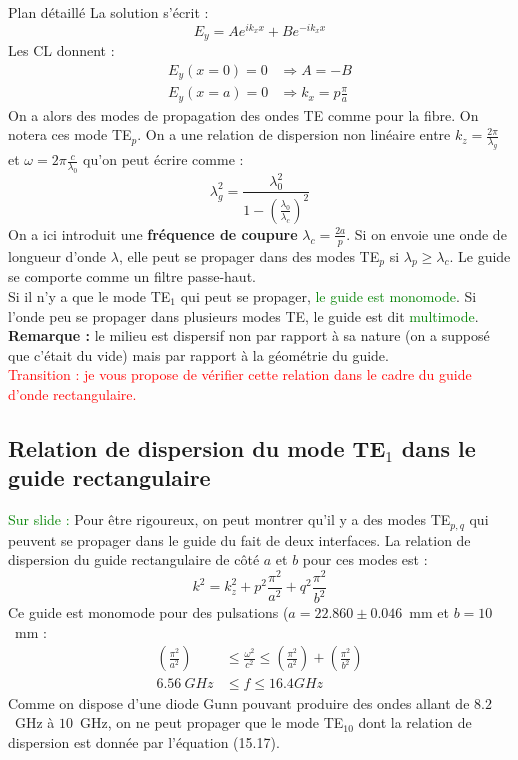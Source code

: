 \begin{reportBlock}{Plan détaillé}
  La solution s'écrit : 
  \begin{equation}
      E_y = Ae^{ik_xx}+Be^{-ik_xx}
  \end{equation}
  Les CL donnent :
  \begin{align}
      E_y(x=0)=0 &\Rightarrow A=-B \\
      E_y(x=a)=0 &\Rightarrow k_x=p\frac{\pi}{a}
  \end{align}
  On a alors des modes de propagation des ondes TE comme pour la fibre. On notera ces mode TE$_{p}$. On a une relation de dispersion non linéaire entre $k_z=\frac{2\pi}{\lambda_g}$ et $\omega=2\pi\frac{c}{\lambda_0}$ qu'on peut écrire comme :
  \begin{equation}
      \lambda_g^2 = \frac{\lambda_0^2}{1-\left(\frac{\lambda_0}{\lambda_c}\right)^2}
  \end{equation}
  On a ici introduit une \textbf{fréquence de coupure} $\lambda_c=\frac{2a}{p}$. Si on envoie une onde de longueur d'onde $\lambda$, elle peut se propager dans des modes TE$_p$ si $\lambda_p\geq\lambda_c$. Le guide se comporte comme un filtre passe-haut.\\
  
  Si il n'y a que le mode TE$_1$ qui peut se propager, \textcolor{green}{le guide est monomode}. Si l'onde peu se propager dans plusieurs modes TE, le guide est dit \textcolor{green}{multimode}. \\
  
  \textbf{Remarque :} le milieu est dispersif non par rapport à sa nature (on a supposé que c'était du vide) mais par rapport à la géométrie du guide.\\

  \textcolor{red}{Transition : je vous propose de vérifier cette relation dans le cadre du guide d'onde rectangulaire.}

  \subsection{Relation de dispersion du mode TE$_1$ dans le guide rectangulaire}
  \textcolor{green}{Sur slide : }Pour être rigoureux, on peut montrer qu'il y a des modes TE$_{p,q}$ qui peuvent se propager dans le guide du fait de deux interfaces. La relation de dispersion du guide rectangulaire de côté $a$ et $b$ pour ces modes est :
  \begin{equation}
      k^2 = k_z^2 + p^2\frac{\pi^2}{a^2}+q^2\frac{\pi^2}{b^2}
  \end{equation}
  Ce guide est monomode pour des pulsations ($a=22.860\pm0.046$~mm et $b=10$~mm :
  \begin{align}
      \left(\frac{\pi^2}{a^2}\right) &\leq \frac{\omega^2}{c^2} \leq \left(\frac{\pi^2}{a^2}\right) + \left(\frac{\pi^2}{b^2}\right) \\
      6.56~GHz &\leq f \leq 16.4GHz 
  \end{align}
  Comme on dispose d'une diode Gunn pouvant produire des ondes allant de $8.2$~GHz à $10$~GHz, on ne peut propager que le mode TE$_{10}$ dont la relation de dispersion est donnée par l'équation (15.17).\\
  

\end{reportBlock}
